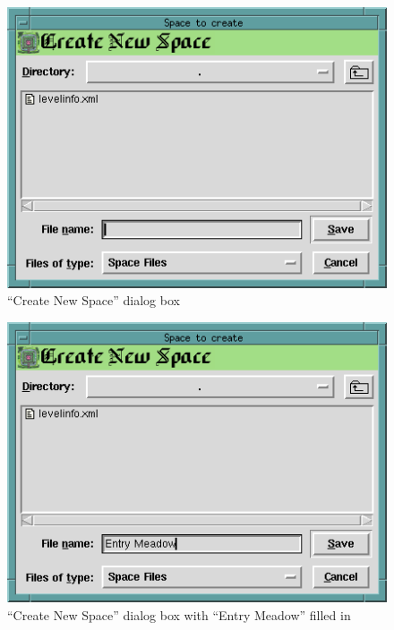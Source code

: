 \begin{figure}[hbpt]
\begin{centering}
\includegraphics{CreateNewSpace.png}
\caption{``Create New Space'' dialog box}
\label{fig:createnewspace}
\end{centering}
\end{figure}
\begin{figure}[hbpt]
\begin{centering}
\includegraphics{CreateEntryMeadowSpace.png}
\caption{``Create New Space'' dialog box with ``Entry Meadow'' filled
in}
\label{fig:createentrymeadownewspace}
\end{centering}
\end{figure}
